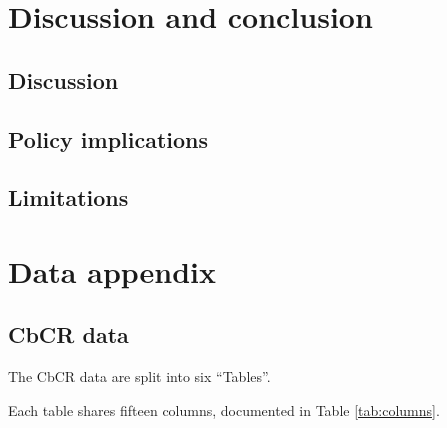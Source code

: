 \documentclass[11pt,a4paper]{article}
\begin{document}
\newpage
\section{Discussion and conclusion}\label{sec:discussion}

\subsection{Discussion}\label{sec:discussion_main}


\subsection{Policy implications}\label{sec:implications}

\subsection{Limitations}\label{sec:limitations}



\newpage
\printbibliography[heading=bibintoc]

\newpage
\appendix
\renewcommand{\thesection}{\Alph{section}}
\renewcommand{\theHsection}{appendix.\Alph{section}}
\renewcommand{\theHsubsection}{appendix.\Alph{section}.\arabic{subsection}}
\renewcommand{\theHsubsubsection}{appendix.\Alph{section}.\arabic{subsection}.\arabic{subsubsection}}
\renewcommand{\thetable}{\Alph{section}.\arabic{table}}
\renewcommand{\thefigure}{\Alph{section}.\arabic{figure}}
\renewcommand{\theequation}{\Alph{section}.\arabic{equation}}
\renewcommand{\theHtable}{appendix.\Alph{section}.\arabic{table}}
\renewcommand{\theHfigure}{appendix.\Alph{section}.\arabic{figure}}
\renewcommand{\theHequation}{appendix.\Alph{section}.\arabic{equation}}
\setcounter{table}{0}
\setcounter{figure}{0}
\setcounter{equation}{0}

\section{Data appendix}\label{app:data}

\subsection{CbCR data}\label{app:CbCR}

The CbCR data are split into six ``Tables''.

Each table shares fifteen columns, documented in Table \ref{tab:columns}.
\end{document}
